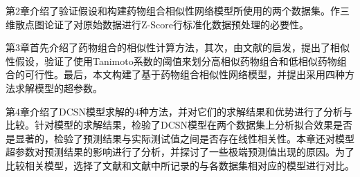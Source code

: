 第2章介绍了验证假设和构建药物组合相似性网络模型所使用的两个数据集。作三维散点图论证了对原始数据进行Z-Score行标准化数据预处理的必要性。

第3章首先介绍了药物组合的相似性计算方法，其次，由文献\supercite{15}的启发，提出了相似性假设，验证了使用Tanimoto系数的阈值来划分高相似药物组合和低相似药物组合的可行性。最后，本文构建了基于药物组合相似性网络模型，并提出采用四种方法求解模型的超参数。

第4章介绍了DCSN模型求解的4种方法，并对它们的求解结果和优势进行了分析与比较。针对模型的求解结果，检验了DCSN模型在两个数据集上分析拟合效果是否是显著的，检验了预测结果与实际测试值之间是否存在线性相关性。本章还对模型超参数对预测结果的影响进行了分析，并探讨了一些极端预测值出现的原因。为了比较相关模型，选择了文献\cite{13}和文献\cite{18}中所记录的与各数据集相对应的模型进行对比。